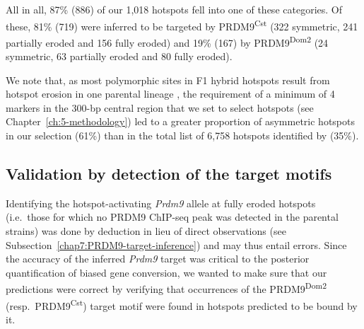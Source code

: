 All in all, 87\% (886) of our 1,018 hotspots fell into one of these categories. 
Of these, 81\% (719) were inferred to be targeted by PRDM9\textsuperscript{Cst} (322 symmetric, 241 partially eroded and 156 fully eroded) and 19\% (167) by PRDM9\textsuperscript{Dom2} (24 symmetric, 63 partially eroded and 80 fully eroded).

We note that, as most polymorphic sites in F1 hybrid hotspots result from hotspot erosion in one parental lineage \citep{smagulova2016evolutionary}, the requirement of a minimum of 4 markers in the 300-bp central region that we set to select hotspots (see Chapter~\ref{ch:5-methodology}) led to a greater proportion of asymmetric hotspots in our selection (61\%) than in the total list of 6,758 hotspots identified by \citet{baker2015prdm9} (35\%).\\




\subsection{Validation by detection of the target motifs}

Identifying the hotspot-activating \textit{Prdm9} allele at fully eroded hotspots (i.e.\ those for which no PRDM9 ChIP-seq peak was detected in the parental strains) was done by deduction in lieu of direct observations (see Subsection~\ref{chap7:PRDM9-target-inference}) and may thus entail errors.
Since the accuracy of the inferred \textit{Prdm9} target was critical to the posterior quantification of biased gene conversion, we wanted to make sure that our predictions were correct by verifying that occurrences of the PRDM9\textsuperscript{Dom2} (resp.\ PRDM9\textsuperscript{Cst}) target motif were found in hotspots predicted to be bound by it.

